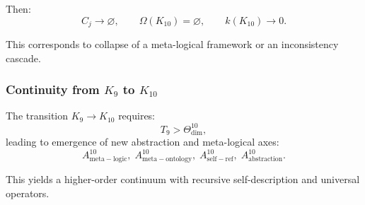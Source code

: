 Then:
\[
  C_j \to \varnothing,\qquad
  \Omega(K_{10})=\varnothing,\qquad
  k(K_{10})\to 0.
\]

This corresponds to collapse of a meta-logical framework or an
inconsistency cascade.


\subsubsection{Continuity from \texorpdfstring{$K_9$}{K_9} to $K_{10}$}

The transition $K_9\to K_{10}$ requires:
\[
  T_9 > \Theta^{10}_{\mathrm{dim}},
\]
leading to emergence of new abstraction and meta-logical axes:
\[
  A^{10}_{\mathrm{meta\!-\!logic}},\;
  A^{10}_{\mathrm{meta\!-\!ontology}},\;
  A^{10}_{\mathrm{self\!-\!ref}},\;
  A^{10}_{\mathrm{abstraction}}.
\]

This yields a higher-order continuum with recursive self-description and
universal operators.
